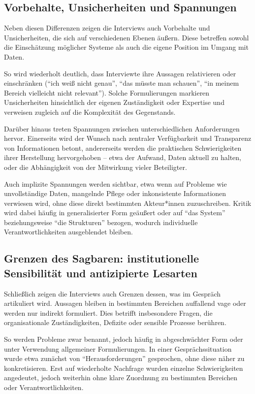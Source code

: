 \documentclass[a4paper,
fontsize=11pt,
oneside,
numbers=noperiodatend,
parskip=half-,
bibliography=totoc,
final
]{scrartcl}
\begin{document}
\subsection{Vorbehalte, Unsicherheiten und
Spannungen}\label{vorbehalte-unsicherheiten-und-spannungen}

Neben diesen Differenzen zeigen die Interviews auch Vorbehalte und
Unsicherheiten, die sich auf verschiedenen Ebenen äußern. Diese
betreffen sowohl die Einschätzung möglicher Systeme als auch die eigene
Position im Umgang mit Daten.

So wird wiederholt deutlich, dass Interviewte ihre Aussagen relativieren
oder einschränken (\enquote{ich weiß nicht genau}, \enquote{das müsste
man schauen}, \enquote{in meinem Bereich vielleicht nicht relevant}).
Solche Formulierungen markieren Unsicherheiten hinsichtlich der eigenen
Zuständigkeit oder Expertise und verweisen zugleich auf die Komplexität
des Gegenstands.

Darüber hinaus treten Spannungen zwischen unterschiedlichen
Anforderungen hervor. Einerseits wird der Wunsch nach zentraler
Verfügbarkeit und Transparenz von Informationen betont, andererseits
werden die praktischen Schwierigkeiten ihrer Herstellung hervorgehoben
-- etwa der Aufwand, Daten aktuell zu halten, oder die Abhängigkeit von
der Mitwirkung vieler Beteiligter.

Auch implizite Spannungen werden sichtbar, etwa wenn auf Probleme wie
unvollständige Daten, mangelnde Pflege oder inkonsistente Informationen
verwiesen wird, ohne diese direkt bestimmten Akteur*innen zuzuschreiben.
Kritik wird dabei häufig in generalisierter Form geäußert oder auf
\enquote{das System} beziehungsweise \enquote{die Strukturen} bezogen,
wodurch individuelle Verantwortlichkeiten ausgeblendet bleiben.

\subsection{Grenzen des Sagbaren: institutionelle Sensibilität und
antizipierte
Lesarten}\label{grenzen-des-sagbaren-institutionelle-sensibilituxe4t-und-antizipierte-lesarten}

Schließlich zeigen die Interviews auch Grenzen dessen, was im Gespräch
artikuliert wird. Aussagen bleiben in bestimmten Bereichen auffallend
vage oder werden nur indirekt formuliert. Dies betrifft insbesondere
Fragen, die organisationale Zuständigkeiten, Defizite oder sensible
Prozesse berühren.

So werden Probleme zwar benannt, jedoch häufig in abgeschwächter Form
oder unter Verwendung allgemeiner Formulierungen. In einer
Gesprächssituation wurde etwa zunächst von \enquote{Herausforderungen}
gesprochen, ohne diese näher zu konkretisieren. Erst auf wiederholte
Nachfrage wurden einzelne Schwierigkeiten angedeutet, jedoch weiterhin
ohne klare Zuordnung zu bestimmten Bereichen oder Verantwortlichkeiten.
\end{document}
